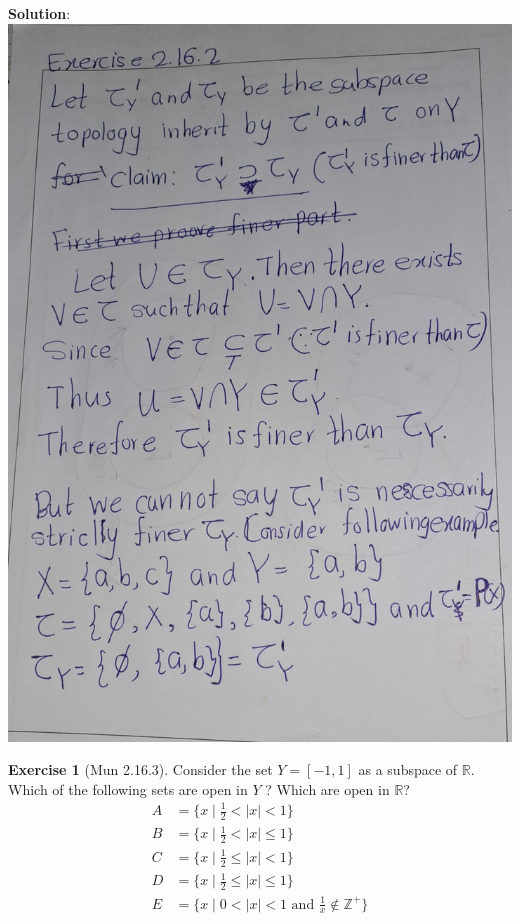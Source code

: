 \documentclass[
]{book}
\theoremstyle{definition}
\theoremstyle{definition}
\theoremstyle{definition}
\newtheorem{exercise}{Exercise}[chapter]
\theoremstyle{definition}
\theoremstyle{remark}
\begin{document}
\textbf{Solution}:
\includegraphics{figures/Exercises/Ex 2.16/ex-2.jpg}

\begin{exercise}[Mun 2.16.3]
\protect\hypertarget{exr:unnamed-chunk-118}{}\label{exr:unnamed-chunk-118}Consider the set \(Y = [−1, 1]\) as a subspace of \(\mathbb{R}\). Which of the following sets are open in \(Y\) ? Which are open in \(\mathbb{R}\)?
\begin{align}
A &= \{ x \mid \frac{1}{2} < |x| < 1 \}\\ 
B &= \{ x \mid \frac{1}{2} < |x| \leq 1 \} \\
C &= \{ x \mid \frac{1}{2} \leq |x| < 1 \}\\
D &= \{ x \mid \frac{1}{2} \leq |x| \leq 1 \}\\
E &= \{ x \mid 0 < |x| < 1 \text{ and } \frac{1}{x} \notin \mathbb{Z}^+ \}
\end{align}
\end{exercise}
\end{document}
